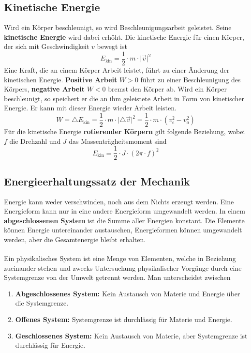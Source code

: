 \subsection{Kinetische Energie}
Wird ein Körper beschleunigt, so wird Beschleunigungsarbeit geleistet. Seine \textbf{kinetische Energie} wird dabei erhöht. Die kinetische Energie für einen Körper, der sich mit Geschwindigkeit $v$ bewegt ist 
\begin{equation} 
\boxed{E_{\text{kin}}=\dfrac{1}{2}\cdot m\cdot \Big\vert \overrightarrow{v}\Big\vert^2}
\end{equation} 
Eine Kraft, die an einem Körper Arbeit leistet, führt zu einer Änderung der kinetischen Energie. \textbf{Positive Arbeit} $W>0$ führt zu einer Beschleunigung des Körpers, \textbf{negative Arbeit} $W<0$ bremst den Körper ab. Wird ein Körper beschleunigt, so speichert er die an ihm geleistete Arbeit in Form von kinetischer Energie. Er kann mit dieser Energie wieder Arbeit leisten.
\begin{equation}
\boxed{W=\triangle E_{\text{kin}}=\dfrac{1}{2}\cdot m\cdot \Big\vert \triangle\overrightarrow{v}\Big\vert^2=\dfrac{1}{2}\cdot m\cdot \left(v_e^2-v_a^2\right)} 
\end{equation} 
Für die kinetische Energie \textbf{rotierender Körpern} gilt folgende Beziehung, wobei $f$ die Drehzahl und $J$ das Massenträgheitsmoment sind
\begin{equation}
\boxed{E_{\text{kin}}=\dfrac{1}{2}\cdot J\cdot \left(2\pi\cdot f\right)^2}
\end{equation}
\subsection{Energieerhaltungssatz der Mechanik}
Energie kann weder verschwinden, noch aus dem Nichts erzeugt werden. Eine Energieform kann nur in eine andere Energieform umgewandelt werden. In einem \textbf{abgeschlossenen System} ist die Summe aller Energien konstant. Die Elemente können Energie untereinander austauschen, Energieformen können umgewandelt werden, aber die Gesamtenergie bleibt erhalten. 
\\\\
Ein physikalisches System ist eine Menge von Elementen, welche in Beziehung zueinander stehen und zwecks Untersuchung physikalischer Vorgänge durch eine Systemgrenze von der Umwelt getrennt werden. Man unterscheidet zwischen 
\begin{enumerate}
\item \textbf{Abgeschlossenes System:} Kein Austausch von Materie und Energie über die Systemgrenze. 
\item \textbf{Offenes System:} Systemgrenze ist durchlässig für Materie und Energie. 
\item \textbf{Geschlossenes System:} Kein Austausch von Materie, aber Systemgrenze ist durchlässig für Energie. 
\end{enumerate}
